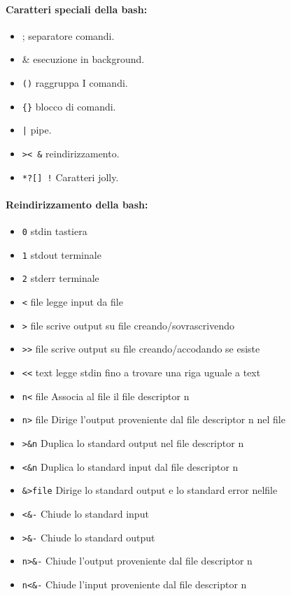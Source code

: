 \documentclass[a4paper]{report}
\begin{document}
\paragraph{Caratteri speciali della bash:}
\begin{itemize}
\item ; separatore comandi.
\item \& esecuzione in background.
\item \texttt{()} raggruppa I comandi.
\item \texttt{\{\}} blocco di comandi.
\item \texttt{|} pipe.
\item \texttt{>< \&} reindirizzamento.
\item \texttt{*?[]~!} Caratteri jolly.
\end{itemize}
\paragraph{Reindirizzamento della bash:}
\begin{itemize}
\item \texttt{0} stdin tastiera
\item \texttt{1} stdout terminale
\item \texttt{2} stderr terminale
\item \texttt{<} file legge input da file
\item \texttt{>} file scrive output su file creando/sovrascrivendo
\item \texttt{>>} file scrive output su file creando/accodando se esiste
\item \texttt{<<} text legge stdin fino a trovare una riga uguale a text
\item \texttt{n<} file Associa al file il file descriptor n
\item \texttt{n>} file Dirige l’output proveniente dal file descriptor n nel file
\item \texttt{>\&n} Duplica lo standard output nel file descriptor n
\item \texttt{<\&n} Duplica lo standard input dal file descriptor n
\item \texttt{\&>file} Dirige lo standard output e lo standard error nelfile
\item \texttt{<\&-} Chiude lo standard input
\item \texttt{>\&-} Chiude lo standard output
\item \texttt{n>\&-} Chiude l’output proveniente dal file descriptor n
\item \texttt{n<\&-} Chiude l’input proveniente dal file descriptor n
\end{itemize}
\end{document}
